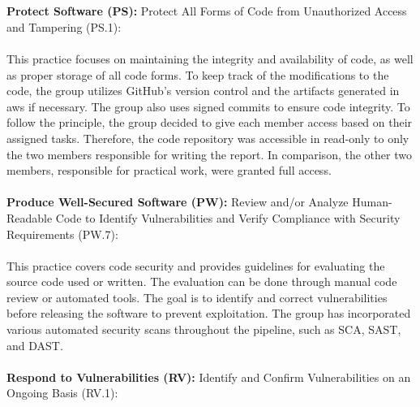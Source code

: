 \\~\\        
\textbf{Protect Software (PS):}
Protect All Forms of Code from Unauthorized
Access and Tampering (PS.1): \textit{}\cite{ssdf}
\\~\\
This practice focuses on maintaining the integrity and availability of code, as well as proper storage of all code forms. To keep track of the modifications to the code, the group utilizes GitHub's version control and the artifacts generated in \acrshort{aws} if necessary. The group also uses signed commits to ensure code integrity. To follow the  principle, the group decided to give each member access based on their assigned tasks. Therefore, the code repository was accessible in read-only to only the two members responsible for writing the report. In comparison, the other two members, responsible for practical work, were granted full access. 
\\~\\
\textbf{Produce Well-Secured Software (PW):} Review and/or Analyze Human-Readable
Code to Identify Vulnerabilities and Verify Compliance with Security Requirements (PW.7): \textit{}\cite{ssdf}
\\~\\
This practice covers code security and provides guidelines for evaluating the source code used or written. The evaluation can be done through manual code review or automated tools. The goal is to identify and correct vulnerabilities before releasing the software to prevent exploitation. The group has incorporated various automated security scans throughout the pipeline, such as SCA, SAST, and DAST. 
\\~\\
\textbf{Respond to Vulnerabilities (RV):}
Identify and Confirm Vulnerabilities on an Ongoing Basis (RV.1): \textit{}\cite{ssdf}
